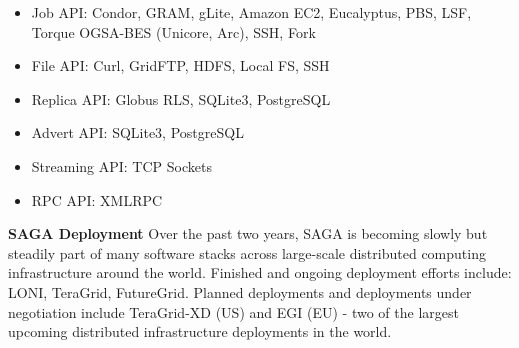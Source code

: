 \documentclass[a0b,portrait]{a0poster}
\begin{document}
\begin{textblock}{7}
\begin{itemize} 
\item{Job API: Condor, GRAM, gLite, Amazon EC2, Eucalyptus, PBS, LSF, Torque
OGSA-BES (Unicore, Arc), SSH, Fork}
\item{File API: Curl, GridFTP, HDFS, Local FS, SSH} 
\item{Replica API: Globus RLS, SQLite3, PostgreSQL}
\item{Advert API: SQLite3, PostgreSQL} 
\item{Streaming API: TCP Sockets} 
\item{RPC API: XMLRPC} 
\end{itemize}

\textbf{\color{DarkBlue} SAGA Deployment } Over the past two years, SAGA is
becoming slowly but steadily part of many software stacks across large-scale
distributed computing infrastructure around the world. Finished and ongoing
deployment efforts include: LONI, TeraGrid, FutureGrid. Planned deployments
and deployments under negotiation include TeraGrid-XD (US) and EGI (EU) - two
of the largest upcoming distributed infrastructure deployments in the world.



\end{textblock}
\end{document}
